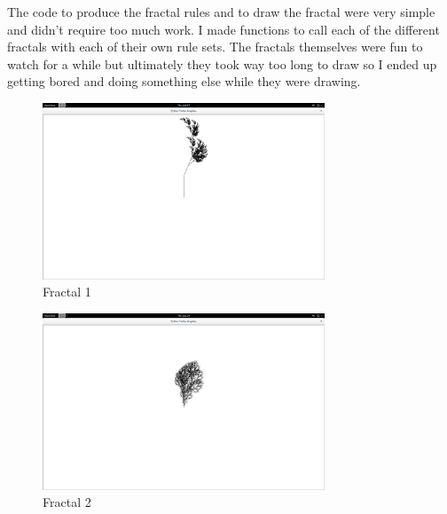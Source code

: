	The code to produce the fractal rules and to draw the fractal were very simple and didn't require too much work.  I made functions to call each of the different fractals with each of their own rule sets.  The fractals themselves were fun to watch for a while but ultimately they took way too long to draw so I ended up getting bored and doing something else while they were drawing. 


\begin{figure}[tbh]
\begin{center}
\includegraphics[width=0.75\textwidth]{fractal1.png}
\end{center}
\caption{Fractal 1\label{fig:gprun}}
\end{figure}

\begin{figure}[tbh]
\begin{center}
\includegraphics[width=0.75\textwidth]{fractal2.png}
\end{center}
\caption{Fractal 2\label{fig:gprun}}
\end{figure}

